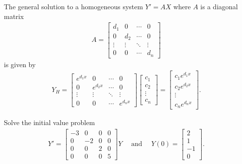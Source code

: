 \documentclass[12pt,a4paper]{article}
\newcounter{example}[section]
\begin{document}
\newpage

The general solution to a homogeneous system $Y' = AX$ where $A$ is a diagonal matrix
	\begin{align*}
	A = \begin{bmatrix}
	d_1 & 0 & \cdots & 0 \\
	0 & d_2 & \cdots & 0 \\
	\vdots & \vdots & \ddots & \vdots \\
	0 & 0 & \cdots & d_n
	\end{bmatrix}
	\end{align*} 
is given by
	\begin{align*}
	Y_H = \begin{bmatrix}
	e^{d_1x} & 0 & \cdots & 0 \\
	0 & e^{d_2x} & \cdots & 0 \\
	\vdots & \vdots & \ddots & \vdots \\
	0 & 0 & \cdots & e^{d_n x}
	\end{bmatrix} \begin{bmatrix}
	c_1 \\ c_2 \\ \vdots \\ c_n
	\end{bmatrix} = \begin{bmatrix}
	c_1 e^{d_1 x} \\ c_2 e^{d_2x} \\ \vdots \\ c_n e^{d_n x}
	\end{bmatrix} .
	\end{align*}
	
	\begin{example}
	Solve the initial value problem
		\begin{align*}
		Y' = \begin{bmatrix} 
		-3 & 0 & 0 & 0 \\
		0 & -2 & 0 & 0 \\
		0 & 0 & 2 & 0 \\
		0 & 0 & 0 & 5 
		\end{bmatrix} Y \quad \text{ and } \quad 
		Y (0) = \begin{bmatrix}
		2 \\ 1 \\ -1 \\ 0
		\end{bmatrix} .
		\end{align*}
	\end{example}
	
\end{document}
